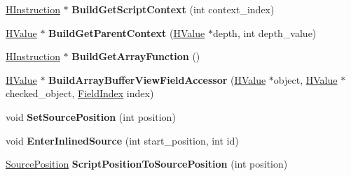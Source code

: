 \begin{DoxyCompactItemize}
\item 
\hyperlink{classv8_1_1internal_1_1_h_instruction}{H\+Instruction} $\ast$ {\bfseries Build\+Get\+Script\+Context} (int context\+\_\+index)\hypertarget{classv8_1_1internal_1_1_h_graph_builder_a179cdcb7b241f9b200355050651a4bb6}{}\label{classv8_1_1internal_1_1_h_graph_builder_a179cdcb7b241f9b200355050651a4bb6}

\item 
\hyperlink{classv8_1_1internal_1_1_h_value}{H\+Value} $\ast$ {\bfseries Build\+Get\+Parent\+Context} (\hyperlink{classv8_1_1internal_1_1_h_value}{H\+Value} $\ast$depth, int depth\+\_\+value)\hypertarget{classv8_1_1internal_1_1_h_graph_builder_a50ca6339e4c6a275ebca93af47cd7135}{}\label{classv8_1_1internal_1_1_h_graph_builder_a50ca6339e4c6a275ebca93af47cd7135}

\item 
\hyperlink{classv8_1_1internal_1_1_h_instruction}{H\+Instruction} $\ast$ {\bfseries Build\+Get\+Array\+Function} ()\hypertarget{classv8_1_1internal_1_1_h_graph_builder_a0cffe26cdad67bac4fd40192d419ac1c}{}\label{classv8_1_1internal_1_1_h_graph_builder_a0cffe26cdad67bac4fd40192d419ac1c}

\item 
\hyperlink{classv8_1_1internal_1_1_h_value}{H\+Value} $\ast$ {\bfseries Build\+Array\+Buffer\+View\+Field\+Accessor} (\hyperlink{classv8_1_1internal_1_1_h_value}{H\+Value} $\ast$object, \hyperlink{classv8_1_1internal_1_1_h_value}{H\+Value} $\ast$checked\+\_\+object, \hyperlink{classv8_1_1internal_1_1_field_index}{Field\+Index} index)\hypertarget{classv8_1_1internal_1_1_h_graph_builder_ac17efbef6e76a110337281a76689757d}{}\label{classv8_1_1internal_1_1_h_graph_builder_ac17efbef6e76a110337281a76689757d}

\item 
void {\bfseries Set\+Source\+Position} (int position)\hypertarget{classv8_1_1internal_1_1_h_graph_builder_a341d6ca5e026323c79d5acbcc050f655}{}\label{classv8_1_1internal_1_1_h_graph_builder_a341d6ca5e026323c79d5acbcc050f655}

\item 
void {\bfseries Enter\+Inlined\+Source} (int start\+\_\+position, int id)\hypertarget{classv8_1_1internal_1_1_h_graph_builder_a2a1bc7e9060908ced61ba3fbe2dc54a7}{}\label{classv8_1_1internal_1_1_h_graph_builder_a2a1bc7e9060908ced61ba3fbe2dc54a7}

\item 
\hyperlink{classv8_1_1internal_1_1_source_position}{Source\+Position} {\bfseries Script\+Position\+To\+Source\+Position} (int position)\hypertarget{classv8_1_1internal_1_1_h_graph_builder_a26d793a22cf31e6f45ee6d096dde9761}{}\label{classv8_1_1internal_1_1_h_graph_builder_a26d793a22cf31e6f45ee6d096dde9761}


\end{DoxyCompactItemize}
